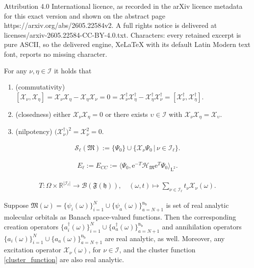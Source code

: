 \documentclass[10pt,a4paper]{amsart}
\begin{document}
Attribution 4.0 International licence, as recorded in the arXiv licence metadata for this exact version and shown on the abstract page https://arxiv.org/abs/2605.22584v2. A full rights notice is delivered at licenses/arxiv-2605.22584-CC-BY-4.0.txt. Characters: every retained excerpt is pure ASCII, so the delivered engine, XeLaTeX with its default Latin Modern text font, reports no missing character.
\begin{proposition}\label{proposition_excitation_comm}
    For any $\nu, \eta \in \mathscr{I}$ it holds that 
    \begin{enumerate}
        \item (commutativity) $[\mathscr{X}_\nu,\mathscr{X}_\eta]=\mathscr{X}_\nu \mathscr{X}_\eta- \mathscr{X}_\eta \mathscr{X}_\nu = 0=\mathscr{X}^\dagger_\nu \mathscr{X}^\dagger_\eta- \mathscr{X}^\dagger_\eta \mathscr{X}^\dagger_\nu=[\mathscr{X}^\dagger_\nu,\mathscr{X}^\dagger_\eta]$.
        \item (closedness) either $\mathscr{X}_\nu \mathscr{X}_\eta=0$ or there exists $\upsilon \in \mathscr{I}$ with $\mathscr{X}_\nu \mathscr{X}_\eta=\mathscr{X}_\upsilon$.
        \item (nilpotency)  $\big(\mathscr{X}^\dagger_\nu\big)^2=\mathscr{X}_\nu^2=0$.
    \end{enumerate}
\end{proposition}

\begin{align}\label{trunc_slater_basis}
    \mathcal{S}_\ell(\mathfrak{M}):=\lbrace \Psi_0\rbrace \cup \lbrace \mathscr{X}_\nu \Psi_0\,|\, \nu \in \mathscr{I}_\ell\rbrace.
\end{align}

\begin{align}\label{cc_energy}
     E_{\ell}:=E_{CC}:=\langle \Psi_0, \mathrm{e}^{-T}\mathcal{H}_\mathfrak{M}\mathrm{e}^T\Psi_0\rangle_{\mathrm{L}^2}.
\end{align}

\begin{align}\label{cluster_function}
    T:\Omega\times\mathbb{R}^{|\mathscr{I}_\ell|}\longrightarrow \mathcal{B}(\mathfrak{F}(\mathfrak{h})), \quad (\omega, t)\mapsto \sum_{\nu\in \mathscr{I}_\ell}t_\nu \mathscr{X}_\nu(\omega).
\end{align}

\begin{lemma}\label{creation_annihili_analytic}
    Suppose $\mathfrak{M}(\omega)=\lbrace \psi_i(\omega)\rbrace_{i=1}^N\cup \lbrace \psi_a(\omega)\rbrace_{a=N+1}^{\mathrm{n}_\mathrm{b}}$ is set of real analytic molecular orbitals as Banach space-valued functions. Then the corresponding creation operators $\lbrace a^\dagger_i(\omega)\rbrace_{i=1}^N\cup \lbrace a^\dagger_a(\omega)\rbrace_{a=N+1}^{\mathrm{n}_\mathrm{b}} $ and annihilation operators $\lbrace a_i(\omega)\rbrace_{i=1}^N\cup \lbrace a_a(\omega)\rbrace_{a=N+1}^{\mathrm{n}_\mathrm{b}}$ are real analytic, as well. Moreover, any excitation operator $\mathscr{X}_\nu(\omega)$, for $\nu\in \mathscr{I}$, and the cluster function \eqref{cluster_function} are also real analytic. 
\end{lemma}
\end{document}
